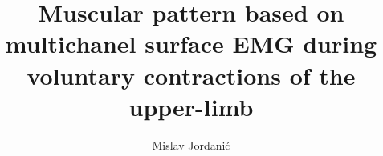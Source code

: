 \documentclass[a4paper,twoside,11pt]{report}
\begin{document}
\title{\LARGE {\bf Muscular pattern based on multichanel surface EMG during voluntary contractions of the upper-limb}\\
 \vspace*{6mm}
}

\author{Mislav Jordani\'{c}}

\normallinespacing
\maketitle

\preface

%
%
%
%

\body

%
%
%
%



\newpage

%

\end{document}
